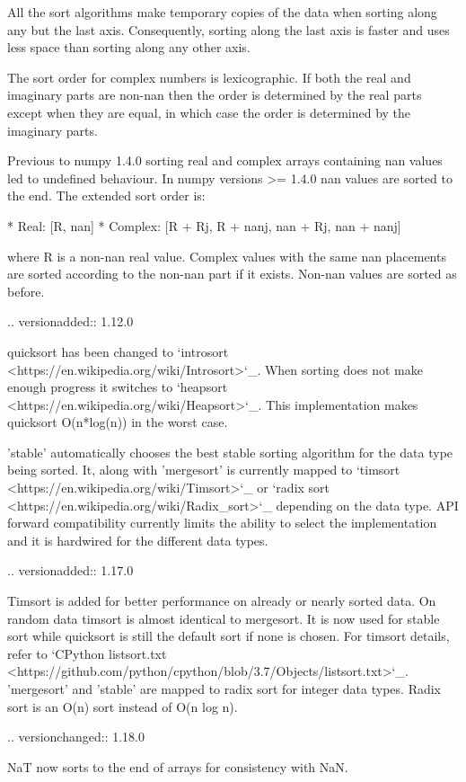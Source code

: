 \begin{DoxyVerb}
All the sort algorithms make temporary copies of the data when
sorting along any but the last axis.  Consequently, sorting along
the last axis is faster and uses less space than sorting along
any other axis.

The sort order for complex numbers is lexicographic. If both the real
and imaginary parts are non-nan then the order is determined by the
real parts except when they are equal, in which case the order is
determined by the imaginary parts.

Previous to numpy 1.4.0 sorting real and complex arrays containing nan
values led to undefined behaviour. In numpy versions >= 1.4.0 nan
values are sorted to the end. The extended sort order is:

  * Real: [R, nan]
  * Complex: [R + Rj, R + nanj, nan + Rj, nan + nanj]

where R is a non-nan real value. Complex values with the same nan
placements are sorted according to the non-nan part if it exists.
Non-nan values are sorted as before.

.. versionadded:: 1.12.0

quicksort has been changed to `introsort <https://en.wikipedia.org/wiki/Introsort>`_.
When sorting does not make enough progress it switches to
`heapsort <https://en.wikipedia.org/wiki/Heapsort>`_.
This implementation makes quicksort O(n*log(n)) in the worst case.

'stable' automatically chooses the best stable sorting algorithm
for the data type being sorted.
It, along with 'mergesort' is currently mapped to
`timsort <https://en.wikipedia.org/wiki/Timsort>`_
or `radix sort <https://en.wikipedia.org/wiki/Radix_sort>`_
depending on the data type.
API forward compatibility currently limits the
ability to select the implementation and it is hardwired for the different
data types.

.. versionadded:: 1.17.0

Timsort is added for better performance on already or nearly
sorted data. On random data timsort is almost identical to
mergesort. It is now used for stable sort while quicksort is still the
default sort if none is chosen. For timsort details, refer to
`CPython listsort.txt <https://github.com/python/cpython/blob/3.7/Objects/listsort.txt>`_.
'mergesort' and 'stable' are mapped to radix sort for integer data types. Radix sort is an
O(n) sort instead of O(n log n).

.. versionchanged:: 1.18.0

NaT now sorts to the end of arrays for consistency with NaN.


\end{DoxyVerb}
